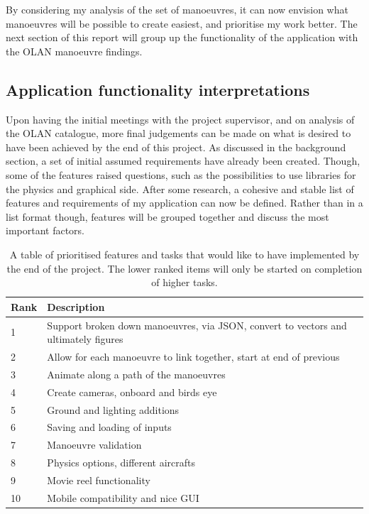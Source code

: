 By considering my analysis of the set of manoeuvres, it can now envision what manoeuvres will be possible to create easiest, and prioritise my work better. The next section of this report will group up the functionality of the application with the OLAN manoeuvre findings.

\subsection{Application functionality interpretations}
Upon having the initial meetings with the project supervisor, and on analysis of the OLAN catalogue, more final judgements can be made on what is desired to have been achieved by the end of this project. As discussed in the background section, a set of initial assumed requirements have already been created. Though, some of the features raised questions, such as the possibilities to use libraries for the physics and graphical side. After some research, a cohesive and stable list of features and requirements of my application can now be defined. Rather than in a list format though, features will be grouped together and discuss the most important factors.

\begin{table}[h]
\caption{A table of prioritised features and tasks that would like to have implemented by the end of the project. The lower ranked items will only be started on completion of higher tasks.}
 \label{tbl:rank-table}
\begin{tabular}{|l|l|}
\hline
\textbf{Rank} & \textbf{Description}                                                                \\ \hline
1             & Support broken down manoeuvres, via JSON, convert to vectors and ultimately figures \\ \hline
2             & Allow for each manoeuvre to link together, start at end of previous                 \\ \hline
3             & Animate along a path of the manoeuvres                                              \\ \hline
4             & Create cameras, onboard and birds eye                                               \\ \hline
5             & Ground and lighting additions                                                       \\ \hline
6             & Saving and loading of inputs                                                        \\ \hline
7             & Manoeuvre validation                                                                \\ \hline
8             & Physics options, different aircrafts                                                \\ \hline
9             & Movie reel functionality                                                            \\ \hline
10            & Mobile compatibility and nice GUI                                                   \\ \hline
\end{tabular}
\end{table}

